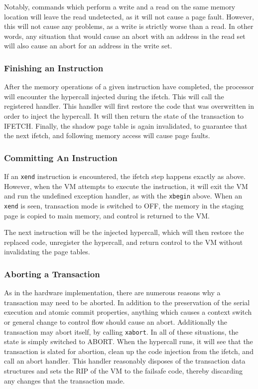 \documentclass{acm_proc_article-sp}
\begin{document}
Notably, commands which perform a write and a read on the same memory location
will leave the read undetected, as it will not cause a page fault. However,
this will not cause any problems, as a write is strictly worse than a read. In
other words, any situation that would cause an abort with an address in the 
read set will also cause an abort for an address in the write set.

\subsubsection{Finishing an Instruction}

After the memory operations of a given instruction have completed, the 
processor will encounter the hypercall injected during the ifetch. This will
call the registered handler. This handler will first restore the code that
was overwritten in order to inject the hypercall. It will then return the state
of the transaction to IFETCH. Finally, the shadow page table is again 
invalidated, to guarantee that the next ifetch, and following memory access 
will cause page faults.  

\subsubsection{Committing An Instruction}

If an \texttt{xend} instruction is encountered, the ifetch step happens exactly as above.
However, when the VM attempts to execute the instruction, it will exit the VM
and run the undefined exception handler, as with the \texttt{xbegin} above. When an \texttt{xend}
is seen, transaction mode is switched to OFF, the memory in the staging page is
copied to main memory, and control is returned to the VM.

The next instruction will be the injected hypercall, which will then restore the
replaced code, unregister the hypercall, and return control to the VM without
invalidating the page tables.

\subsubsection{Aborting a Transaction}

As in the hardware implementation, there are numerous reasons why a transaction
may need to be aborted. In addition to the preservation of the serial execution
and atomic commit properties, anything which causes a context switch or general
change to control flow should cause an abort. Additionally the transaction may
abort itself, by calling \texttt{xabort}. In all of these situations, the state is 
simply switched to ABORT. When the hypercall runs, it will see that the 
transaction is slated for abortion, clean up the code injection from the ifetch,
and call an abort handler. This handler reasonably disposes of the transaction
data structures and sets the RIP of the VM to the failsafe code, thereby
discarding any changes that the transaction made. 
\end{document}
